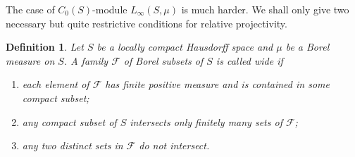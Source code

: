 \documentclass[12pt]{article}
\newtheorem{definition}[theorem]{Definition}
\begin{document}
The case of $C_0(S)$-module $L_\infty(S,\mu)$ is much harder. We shall only give
two necessary but quite restrictive conditions for relative projectivity.

\begin{definition}\label{WideFamilyDef} Let $S$ be a locally compact Hausdorff
    space and $\mu$ be a Borel measure on $S$. A family $\mathcal{F}$ of Borel
    subsets of $S$ is called wide if
    \begin{enumerate}[label = (\roman*)]
        \item each element of $\mathcal{F}$ has finite positive measure and is
              contained in some compact subset;
        \item  any compact subset of $S$ intersects only finitely many sets of
              $\mathcal{F}$;
        \item  any two distinct sets in $\mathcal{F}$ do not intersect.
    \end{enumerate}
\end{definition}
\end{document}
